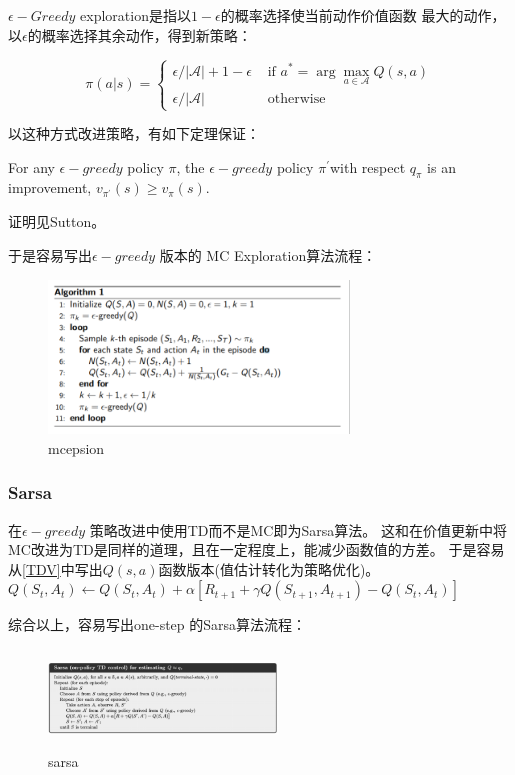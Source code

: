 \documentclass[UTF8]{ctexart}
\begin{document}
$\epsilon-Greedy$ exploration是指以$1-\epsilon$的概率选择使当前动作价值函数
最大的动作，以$\epsilon$的概率选择其余动作，得到新策略：

$$\pi(a | s)=\left\{\begin{array}{ll}
    \epsilon /|\mathcal{A}|+1-\epsilon & \text { if } a^{*}=\arg \max _{a \in \mathcal{A}} Q(s, a) \\
    \epsilon /|\mathcal{A}| & \text { otherwise }
    \end{array}\right.
$$


以这种方式改进策略，有如下定理保证：
\begin{theorem}
    For any $\epsilon-greedy$ policy $\pi$, the $\epsilon-greedy$ policy 
    $\pi^{\prime} $with respect $q_{\pi}$ is an improvement, 
    $v_{\pi^{\prime}}(s) \geq v_{\pi}(s)$.
\end{theorem}

证明见Sutton。

于是容易写出$\epsilon-greedy$ 版本的 MC Exploration算法流程：
\begin{figure}[htbp]
	\centering
	\includegraphics[width=8cm, height=4.1cm]{./pic/mc_epsion.png}
	\caption{mcepsion}
\end{figure}


\subsubsection{Sarsa}
在$\epsilon-greedy$ 策略改进中使用TD而不是MC即为Sarsa算法。
这和在价值更新中将MC改进为TD是同样的道理，且在一定程度上，能减少函数值的方差。
于是容易从\eqref{TDV}中写出$Q(s,a)$函数版本(值估计转化为策略优化)。
$Q\left(S_{t}, A_{t}\right) \leftarrow Q\left(S_{t}, A_{t}\right)+\alpha\left[R_{t+1}+\gamma Q\left(S_{t+1},
 A_{t+1}\right)-Q\left(S_{t}, A_{t}\right)\right]$

综合以上，容易写出one-step 的Sarsa算法流程：

\begin{figure}[htbp]
	\centering
	\includegraphics[width=6.1cm, height=2.6cm]{./pic/sarsa.png}
	\caption{sarsa}
\end{figure}
\end{document}
